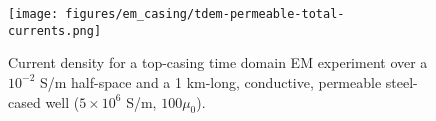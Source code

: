 \begin{figure}
    \begin{center}
    \texttt{[image: figures/em\_casing/tdem-permeable-total-currents.png]}
    \end{center}
\caption{
    Current density for a top-casing time domain EM experiment over a $10^{-2}$ S/m half-space and a 1 km-long, conductive, permeable steel-cased well ($5 \times 10^{6}$ S/m, $100\mu_0$).
}
\label{fig:tdem-permeable-total-currents}
\end{figure}




